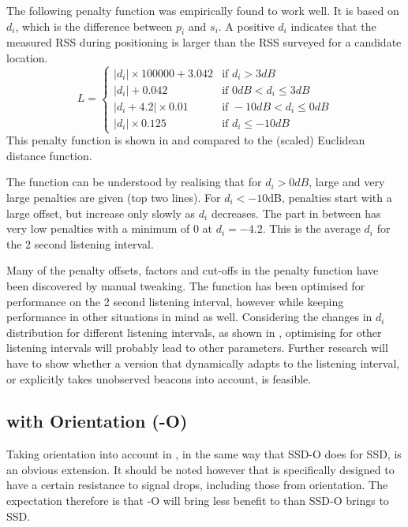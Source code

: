 
The following penalty function was empirically found to work well.
It is based on $d_i$, which is the difference between $p_i$ and $s_i$.
A positive $d_i$ indicates that the measured RSS during positioning is larger than the RSS surveyed for a candidate location.
\begin{equation}
    L = \begin{cases}
        |d_i| \times 100000 +3.042  & \text{if } d_i > 3dB \\
        |d_i| +0.042                & \text{if } 0dB < d_i \leq 3dB \\
        |d_i+4.2| \times 0.01       & \text{if } -10dB < d_i \leq 0dB \\
        |d_i| \times 0.125          & \text{if } d_i \leq -10dB 
    \end{cases}
    \label{eq:architecture-BRP-punishment}
\end{equation}
This penalty function is shown in  and compared to the (scaled) Euclidean distance function.

The function can be understood by realising that for $d_i > 0dB$, large and very large penalties are given (top two lines).
For $d_i < -10$dB, penalties start with a large offset, but increase only slowly as $d_i$ decreases.
The part in between has very low penalties with a minimum of 0 at $d_i = -4.2$.
This is the average $d_i$ for the 2 second listening interval.

Many of the penalty offsets, factors and cut-offs in the \aBRP penalty function have been discovered by manual tweaking.
The function has been optimised for performance on the 2 second listening interval, however while keeping performance in other situations in mind as well.
Considering the changes in $d_i$ distribution for different listening intervals, as shown in , optimising for other listening intervals will probably lead to other parameters.
Further research will have to show whether a version that dynamically adapts to the listening interval, or explicitly takes unobserved beacons into account, is feasible.

\subsection{\BRP with Orientation (\aBRP-O)}
Taking orientation into account in \aBRP, in the same way that SSD-O does for SSD, is an obvious extension.
It should be noted however that \aBRP is specifically designed to have a certain resistance to signal drops, including those from orientation.
The expectation therefore is that \aBRP-O will bring less benefit to \aBRP than SSD-O brings to SSD.

